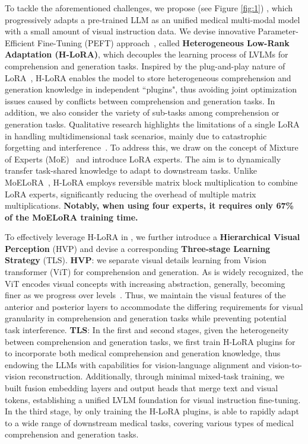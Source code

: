 To tackle the aforementioned challenges, we propose \ourmethod{} (see Figure \ref{fig:1})
, which progressively adapts a pre-trained LLM as an unified medical multi-modal model with a small amount of visual instruction data. 
We devise innovative Parameter-Efficient Fine-Tuning (PEFT) approach~\cite{ding2023parameter}, called \textbf{Heterogeneous Low-Rank Adaptation (H-LoRA)}, which decouples the learning process of LVLMs for comprehension and generation tasks. Inspired by the plug-and-play nature of LoRA~\cite{hu2021lora}, H-LoRA enables the model to store heterogeneous comprehension and generation knowledge
in independent ``plugins", thus avoiding joint optimization issues caused by conflicts between
comprehension and generation tasks. 
In addition, we also consider the variety of sub-tasks among comprehension or generation tasks.  Qualitative research highlights the limitations of a single LoRA in handling multidimensional task scenarios, mainly due to catastrophic forgetting and interference~\cite{liu2024moe,lin2024teamlora}. To address this, we draw on the concept of Mixture of Experts (MoE)~\cite{masoudnia2014mixture} and introduce LoRA experts. The aim is to dynamically transfer task-shared knowledge to adapt to downstream tasks.
Unlike MoELoRA~\cite{luo2024moelora}, H-LoRA
employs reversible matrix block multiplication to combine LoRA experts, significantly reducing the overhead of multiple matrix multiplications.
\textbf{Notably, when using four experts, it requires only 67\% of the MoELoRA training time.}



To effectively leverage H-LoRA in \ourmethod{}, we further introduce a  \textbf{Hierarchical Visual Perception} (HVP) and devise a corresponding \textbf{Three-stage Learning Strategy} (TLS). \textbf{HVP}: we separate visual details learning from Vision transformer (ViT) for comprehension and generation. As is widely recognized, the ViT encodes visual concepts with increasing abstraction, generally, becoming finer as we progress over levels~\cite{vig2019multiscale}. 
Thus, we maintain the visual features of the anterior and posterior layers to accommodate the differing requirements for visual granularity in comprehension and generation tasks while preventing potential task interference.
\textbf{TLS}:
In the first and second stages, given the heterogeneity between comprehension and generation tasks, we first train H-LoRA plugins for \ourmethod{} to incorporate both medical comprehension and generation knowledge, thus endowing the LLMs with capabilities for vision-language alignment and vision-to-vision reconstruction.
Additionally, through minimal mixed-task training, we built fusion embedding layers and output heads that merge text and visual tokens, establishing a unified LVLM foundation for visual instruction fine-tuning.
In the third stage, by only training the H-LoRA plugins, \ourmethod{} is able to rapidly adapt to a wide range of downstream medical tasks, covering various types of medical comprehension and generation tasks.



